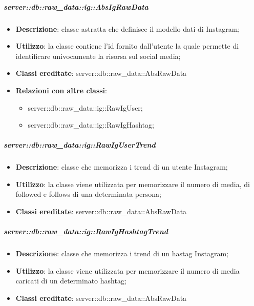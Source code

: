 		
		\subparagraph{server::db::raw\_data::ig::AbsIgRawData} %
		\label{subp:server_db_raw_data_ig_absigrawdata}
			\begin{itemize}
				\item \textbf{Descrizione}: classe astratta che definisce il modello dati di Instagram;
				\item \textbf{Utilizzo}: la classe contiene l'id fornito dall'utente la quale permette di identificare univocamente la risorsa sul social media;
				\item \textbf{Classi ereditate}: server::db::raw\_data::AbsRawData
				\item \textbf{Relazioni con altre classi}:
					\begin{itemize}
						\item server::db::raw\_data::ig::RawIgUser;
						\item server::db::raw\_data::ig::RawIgHashtag;
					\end{itemize}
			\end{itemize}


		\subparagraph{server::db::raw\_data::ig::RawIgUserTrend} %
		\label{subp:server_db_raw_data_ig_rawigusertrend}
			\begin{itemize}
				\item \textbf{Descrizione}: classe che memorizza i trend di un utente Instagram;
				\item \textbf{Utilizzo}: la classe viene utilizzata per memorizzare il numero di media, di followed e follows di una determinata persona;
				\item \textbf{Classi ereditate}: server::db::raw\_data::AbsRawData
			\end{itemize}


		\subparagraph{server::db::raw\_data::ig::RawIgHashtagTrend} %
		\label{subp:server_db_raw_data_ig_rawighashtagtrend}
			\begin{itemize}
				\item \textbf{Descrizione}: classe che memorizza i trend di un hastag Instagram;
				\item \textbf{Utilizzo}: la classe viene utilizzata per memorizzare il numero di media caricati di un determinato hashtag;
				\item \textbf{Classi ereditate}: server::db::raw\_data::AbsRawData
			\end{itemize}



